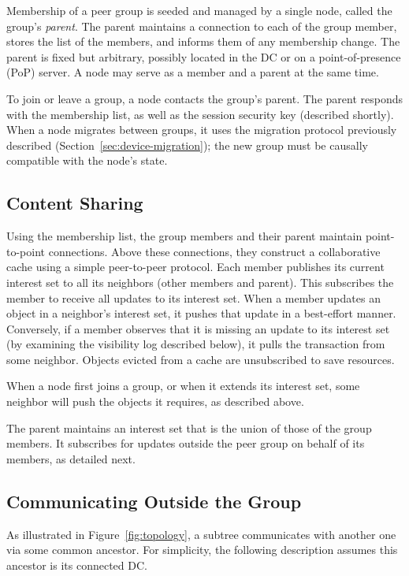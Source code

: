 Membership of a peer group is seeded and managed by a single node,
called the group's \emph{parent}.
The parent maintains a connection to each of the group member, stores
the list of the members, and informs them of any membership change.
The parent is fixed but arbitrary, possibly located in the DC or on a
point-of-presence (PoP) server.
A node may serve as a member and a parent at the same time.

To join or leave a group, a node contacts the group's parent.
The parent responds with the membership list, as well as the session
security key (described shortly).
When a node migrates between groups, it uses the migration protocol
previously described (Section~\ref{sec:device-migration}); the new group
must be causally compatible with the node's state.

\subsection{Content Sharing}
\label{sec:content-sharing}

Using the membership list, the group members and their parent maintain
point-to-point connections.
Above these connections, they construct a collaborative cache using a simple peer-to-peer
protocol.
Each member publishes its current interest set to all its neighbors
(other members and parent).
This subscribes the member to receive all updates to its interest set.
When a member updates an object in a neighbor's interest set, it pushes
that update in a best-effort manner.
Conversely, if a member observes that it is missing an update to its
interest set (by examining the visibility log described below), it pulls
the transaction from some neighbor.
Objects evicted from a cache are unsubscribed to save resources.

When a node first joins a group, or when it extends its interest set,
some neighbor will push the objects it requires, as described above.

The parent maintains an interest set that is the union of those of the
group members.
It subscribes for updates outside the peer group on behalf of its
members, as detailed next.

\subsection{Communicating Outside the Group}
\label{sec:comm-outs-group}

As illustrated in Figure~\ref{fig:topology}, a subtree communicates with
another one via some common ancestor.
For simplicity, the following description assumes this ancestor is
its connected DC\@.%


